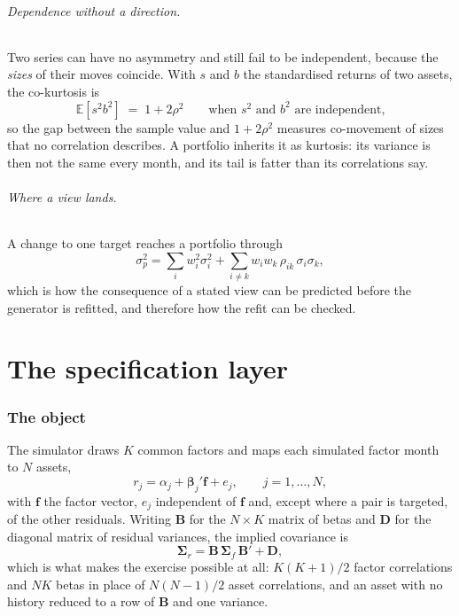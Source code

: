 \documentclass[11pt]{article}
\newcommand{\bbeta}{\boldsymbol\beta}
\newcommand{\bSigma}{\boldsymbol\Sigma}
\newcommand{\bff}{\mathbf f}
\begin{document}
\paragraph{Dependence without a direction.} Two series can have no asymmetry
and still fail to be independent, because the \emph{sizes} of their moves
coincide. With $s$ and $b$ the standardised returns of two assets, the
co-kurtosis is
\begin{equation}\label{eq:cokurtosis}
  \mathbb E[s^2 b^2] \;=\; 1 + 2\rho^2
  \qquad \text{when } s^2 \text{ and } b^2 \text{ are independent,}
\end{equation}
so the gap between the sample value and $1 + 2\rho^2$ measures co-movement of
sizes that no correlation describes. A portfolio inherits it as kurtosis: its
variance is then not the same every month, and its tail is fatter than its
correlations say.

\paragraph{Where a view lands.} A change to one target reaches a portfolio
through
\begin{equation}\label{eq:port_var}
  \sigma_p^2 = \sum_i w_i^2 \sigma_i^2 + \sum_{i \ne k} w_i w_k\, \rho_{ik}\, \sigma_i \sigma_k ,
\end{equation}
which is how the consequence of a stated view can be predicted before the
generator is refitted, and therefore how the refit can be checked.

\part{The specification layer}

\section{The object}

The simulator draws $K$ common factors and maps each simulated factor month to
$N$ assets,
\begin{equation}\label{eq:model}
  r_j = \alpha_j + \bbeta_j' \bff + e_j, \qquad j = 1, \dots, N,
\end{equation}
with $\bff$ the factor vector, $e_j$ independent of $\bff$ and, except where a
pair is targeted, of the other residuals. Writing $\mathbf B$ for the $N \times
K$ matrix of betas and $\mathbf D$ for the diagonal matrix of residual
variances, the implied covariance is
\begin{equation}\label{eq:cov}
  \bSigma_r = \mathbf B\, \bSigma_f\, \mathbf B' + \mathbf D ,
\end{equation}
which is what makes the exercise possible at all: $K(K+1)/2$ factor
correlations and $NK$ betas in place of $N(N-1)/2$ asset correlations, and an
asset with no history reduced to a row of $\mathbf B$ and one variance.
\end{document}
